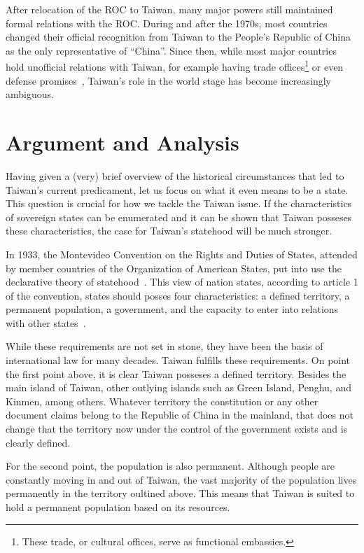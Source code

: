 \documentclass{article}
\begin{document}
After relocation of the ROC to Taiwan, many major powers still maintained formal
relations with the ROC\@. During and after the 1970s, most countries changed their
official recognition from Taiwan to the People's Republic of China as the only 
representative of ``China''. Since then, while most major countries hold unofficial 
relations with Taiwan, for example having trade offices\footnote{These trade, or cultural offices, serve as functional embassies.}
or even defense promises~\cite{TaiwanRelationsAct}, Taiwan's role in the world stage has become increasingly ambiguous.

\section{Argument and Analysis}

Having given a (very) brief overview of the historical circumstances that led to 
Taiwan's current predicament, let us focus on what it even means to be a state. This 
question is crucial for how we tackle the Taiwan issue.
If the characteristics of sovereign states can be enumerated and it can be shown that Taiwan
posseses these characteristics, the case for Taiwan's statehood will be much stronger.

In 1933, the Montevideo Convention on the Rights and Duties of States, attended by member countries of the 
Organization of American States, put into use the declarative theory of statehood~\cite{MontevideoConvention}. 
This view of nation states,
according to article 1 of the convention, states should posses four characteristics: a defined territory, a permanent population,
a government, and the capacity to enter into relations with other states~\cite{MontevideoConventionText}.

While these requirements are not set in stone, they have been the basis of international law for many decades.
Taiwan fulfills these requirements. On point the first point above, it is clear Taiwan posseses a defined territory. 
Besides the main island of Taiwan, other outlying islands such as Green Island, Penghu, and Kinmen, among others. 
Whatever territory the constitution or any other document claims belong to the Republic of China in the mainland,
that does not change that the territory now under the control of the government exists
and is clearly defined.

For the second point, the population is also permanent. Although people are constantly 
moving in and out of Taiwan, the vast majority of the population lives permanently in the
territory oultined above. This means that Taiwan is suited to hold a permanent population
based on its resources. 
\end{document}
